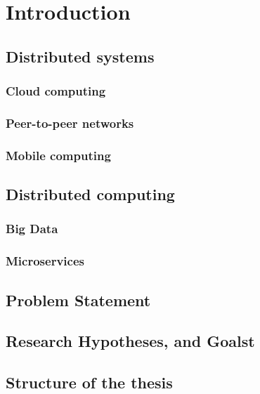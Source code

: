 \pagestyle{fancy}
\fancyhf{}
\fancyhead[CE,CO]{\leftmark}
\fancyfoot[CE,CO]{\thepage}
\chapter{Introduction}\label{chapter:Intro}
%
%
%



\section{Distributed systems}\label{sec:distributed_systems}
%
%
\subsection{Cloud computing}\label{sec:cloud_computing}
%
%
\subsection{Peer-to-peer networks}\label{sec:p2p_networks}
%
%
\subsection{Mobile computing}\label{sec:mobile_computing}
%
%



\section{Distributed computing}\label{sec:distributed_computing}
%
%
\subsection{Big Data}\label{sec:big_data}
%
%
\subsection{Microservices}\label{sec:microservices}
%
%



\section{Problem Statement}\label{sec:problem_statement}
%
%



\section{Research Hypotheses, and Goalst}\label{sec:research_hyphotesis_and_golas}
%
%




\section{Structure of the thesis}\label{sec:structure_of_thesis}
%
%


